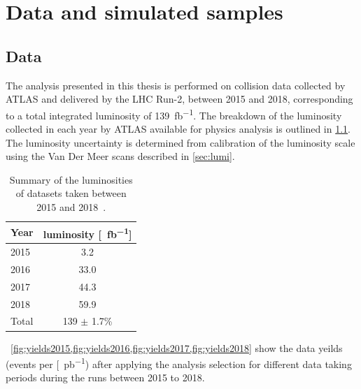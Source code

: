 \chapter{Data and simulated samples}\label{chap:datamc}

\section{Data}\label{sec:datamc:data}
The analysis presented in this thesis is performed on \emph{\protonproton} collision data collected by ATLAS and delivered by the LHC Run-2, between 2015 and 2018, corresponding to a total integrated luminosity of \SI{139}{\femto\barn^{-1}}. The breakdown of the luminosity collected in each year by ATLAS available for physics analysis is outlined in \cref{tab:data:lumi}. The luminosity uncertainty is determined from calibration of the luminosity scale using the Van Der Meer scans described in \cref{sec:lumi}. 
\begin{table}[h]
    \centering
    \begin{tabular}{l|c}
        Year & luminosity [\SI{}{\femto\barn^{-1}}] \\
        \hline
        2015 & 3.2 \\
        2016 & 33.0 \\
        2017 & 44.3 \\
        2018 & 59.9 \\
        \hline 
        \hline
        Total & 139 $\pm$ 1.7\% \\
	\end{tabular}
    \caption[Summary of the luminosities of datasets taken between 2015 and 2018]{Summary of the luminosities of datasets taken between 2015 and 2018~\cite{ATLAS:lumiPlots}.}
    \label{tab:data:lumi}
  \end{table}

~\cref{fig:yields2015,fig:yields2016,fig:yields2017,fig:yields2018} show the data yeilds (events per [\SI{}{\pico\barn^{-1}}) after applying the analysis selection for different data taking periods during the runs between 2015 to 2018. 

